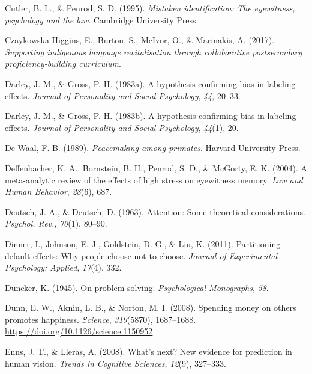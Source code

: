 \documentclass[
]{krantz}
\newlength{\cslhangindent}
\newlength{\cslentryspacingunit} %
\newenvironment{CSLReferences}[2] %
 {%
  \setlength{\parindent}{0pt}
  \ifodd #1
  \let\oldpar\par
  \def\par{\hangindent=\cslhangindent\oldpar}
  \fi
  \setlength{\parskip}{#2\cslentryspacingunit}
 }%
 {}
\begin{document}
\begin{CSLReferences}{1}{0}
\leavevmode{}%
Cutler, B. L., \& Penrod, S. D. (1995). \emph{Mistaken identification: The eyewitness, psychology and the law}. Cambridge University Press.

\leavevmode{}%
Czaykowska-Higgins, E., Burton, S., McIvor, O., \& Marinakis, A. (2017). \emph{Supporting indigenous language revitalisation through collaborative postsecondary proficiency-building curriculum}.

\leavevmode{}%
Darley, J. M., \& Gross, P. H. (1983a). A hypothesis-confirming bias in labeling effects. \emph{Journal of Personality and Social Psychology}, \emph{44}, 20--33.

\leavevmode{}%
Darley, J. M., \& Gross, P. H. (1983b). A hypothesis-confirming bias in labeling effects. \emph{Journal of Personality and Social Psychology}, \emph{44}(1), 20.

\leavevmode{}%
De Waal, F. B. (1989). \emph{Peacemaking among primates}. Harvard University Press.

\leavevmode{}%
Deffenbacher, K. A., Bornstein, B. H., Penrod, S. D., \& McGorty, E. K. (2004). A meta-analytic review of the effects of high stress on eyewitness memory. \emph{Law and Human Behavior}, \emph{28}(6), 687.

\leavevmode{}%
Deutsch, J. A., \& Deutsch, D. (1963). Attention: Some theoretical considerations. \emph{Psychol. Rev.}, \emph{70}(1), 80--90.

\leavevmode{}%
Dinner, I., Johnson, E. J., Goldstein, D. G., \& Liu, K. (2011). Partitioning default effects: Why people choose not to choose. \emph{Journal of Experimental Psychology: Applied}, \emph{17}(4), 332.

\leavevmode{}%
Duncker, K. (1945). On problem-solving. \emph{Psychological Monographs}, \emph{58}.

\leavevmode{}%
Dunn, E. W., Aknin, L. B., \& Norton, M. I. (2008). Spending money on others promotes happiness. \emph{Science}, \emph{319}(5870), 1687--1688. \url{https://doi.org/10.1126/science.1150952}

\leavevmode{}%
Enns, J. T., \& Lleras, A. (2008). What's next? New evidence for prediction in human vision. \emph{Trends in Cognitive Sciences}, \emph{12}(9), 327--333.


\end{CSLReferences}
\end{document}
